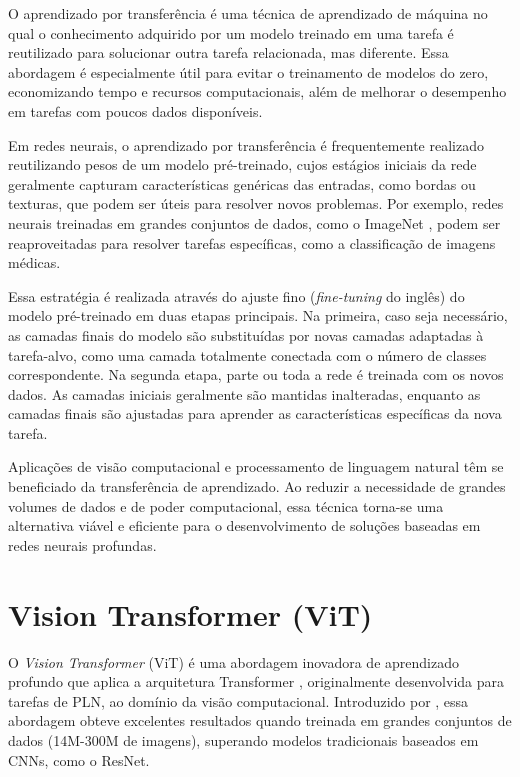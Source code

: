 O aprendizado por transferência \citep{Zhuang2021} é uma técnica de aprendizado de máquina no qual o conhecimento adquirido por um modelo treinado em uma tarefa é reutilizado para solucionar outra tarefa relacionada, mas diferente. Essa abordagem é especialmente útil para evitar o treinamento de modelos do zero, economizando tempo e recursos computacionais, além de melhorar o desempenho em tarefas com poucos dados disponíveis.

Em redes neurais, o aprendizado por transferência é frequentemente realizado reutilizando pesos de um modelo pré-treinado, cujos estágios iniciais da rede geralmente capturam características genéricas das entradas, como bordas ou texturas, que podem ser úteis para resolver novos problemas. Por exemplo, redes neurais treinadas em grandes conjuntos de dados, como o ImageNet \citep{Russakovsky2015}, podem ser reaproveitadas para resolver tarefas específicas, como a classificação de imagens médicas.

Essa estratégia é realizada através do ajuste fino (\textit{fine-tuning} do inglês) do modelo pré-treinado em duas etapas principais. Na primeira, caso seja necessário, as camadas finais do modelo são substituídas por novas camadas adaptadas à tarefa-alvo, como uma camada totalmente conectada com o número de classes correspondente. Na segunda etapa, parte ou toda a rede é treinada com os novos dados. As camadas iniciais geralmente são mantidas inalteradas, enquanto as camadas finais são ajustadas para aprender as características específicas da nova tarefa.

Aplicações de visão computacional e processamento de linguagem natural têm se beneficiado da transferência de aprendizado. Ao reduzir a necessidade de grandes volumes de dados e de poder computacional, essa técnica torna-se uma alternativa viável e eficiente para o desenvolvimento de soluções baseadas em redes neurais profundas.

\section{Vision Transformer (ViT)}\label{sec:vision-transformers}

O \textit{Vision Transformer} (ViT) é uma abordagem inovadora de aprendizado profundo que aplica a arquitetura Transformer \citep{vaswani2023attentionneed}, originalmente desenvolvida para tarefas de PLN, ao domínio da visão computacional. Introduzido por \cite{Dosovitskiy2021}, essa abordagem obteve excelentes resultados quando treinada em grandes conjuntos de dados (14M-300M de imagens), superando modelos tradicionais baseados em CNNs, como o ResNet.

